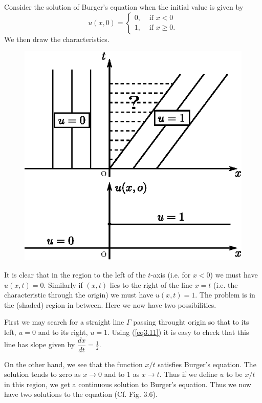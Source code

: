 \begin{exam}\label{chap3:exam3.2}
Consider the solution of Burger's equation when the initial value is
given by 
$$
u(x,0) = 
\begin{cases}
0, & \text{ if } x < 0\\
1, & \text{ if } x \geq 0.
\end{cases}
$$
We then draw the characteristics. 
\begin{figure}[H]
\centering
\includegraphics{figures/fig52-3.5.eps}
\caption{}\label{c3:fig3.5}
\end{figure}\pageoriginale

It is clear that in the region to the left of the $t$-axis (i.e. for
$x<0$) we must have $u(x,t) =0$. Similarly if $(x,t)$ lies to the
right of the line $x=t$ (i.e. the characteristic through the origin)
we must have $u(x,t) =1$. The problem is in the (shaded) region in
between. Here we now have two possibilities.

First we may search for a straight line $\Gamma$ passing throught
origin so that to its left, $u=0$ and to its right, $u=1$. Using
(\ref{eq3.11}) it is easy to check that this line has slope given by
$\dfrac{dx}{dt} = \frac{1}{2}$. 

On the other hand, we see that the function $x/t$ satisfies Burger's
equation. The solution tends to zero as $x \to 0$ and to 1 as $x \to
t$. Thus if we define $u$ to be $x/t$ in this region, we get a
continuous solution to Burger's equation. Thus we now have two
solutions to the equation (Cf. Fig. 3.6). 


\end{exam}

